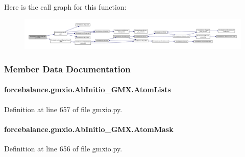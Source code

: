 Here is the call graph for this function\-:\nopagebreak
\begin{figure}[H]
\begin{center}
\leavevmode
\includegraphics[width=350pt]{classforcebalance_1_1target_1_1Target_af6099ec09486213869dba2491bd8ea04_cgraph}
\end{center}
\end{figure}




\subsubsection{Member Data Documentation}
\hypertarget{classforcebalance_1_1gmxio_1_1AbInitio__GMX_a802fa83fad6f5a7caa5de1cfb21f7662}{
\paragraph[{Atom\-Lists}]{\setlength{\rightskip}{0pt plus 5cm}forcebalance.\-gmxio.\-Ab\-Initio\-\_\-\-G\-M\-X.\-Atom\-Lists}}\label{classforcebalance_1_1gmxio_1_1AbInitio__GMX_a802fa83fad6f5a7caa5de1cfb21f7662}


Definition at line 657 of file gmxio.\-py.

\hypertarget{classforcebalance_1_1gmxio_1_1AbInitio__GMX_a1ba04a104c0a2e1bafdf3281c95bac72}{
\paragraph[{Atom\-Mask}]{\setlength{\rightskip}{0pt plus 5cm}forcebalance.\-gmxio.\-Ab\-Initio\-\_\-\-G\-M\-X.\-Atom\-Mask}}\label{classforcebalance_1_1gmxio_1_1AbInitio__GMX_a1ba04a104c0a2e1bafdf3281c95bac72}


Definition at line 656 of file gmxio.\-py.

